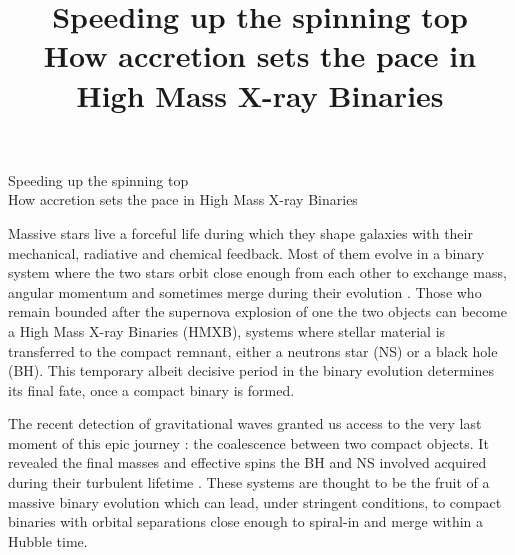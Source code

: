 \documentclass[letterpaper,12pt,onecolumn]{article}
\title{	
\vspace*{-2.5cm}
\Large Speeding up the spinning top\\
\large How accretion sets the pace in High Mass X-ray Binaries  \\ %
}
\author{\tiny} %
\date{\tiny }%
\makeatletter
\newcommand*{\hmxb}{HMXB\@\xspace}
\newcommand*{\ns}{NS\@\xspace}
\newcommand*{\bh}{BH\@\xspace}
\makeatother
\begin{document}


\thispagestyle{empty}

\begin{center}
\Large Speeding up the spinning top\\
\large How accretion sets the pace in High Mass X-ray Binaries 
\end{center}
\normalfont

Massive stars live a forceful life during which they shape galaxies with their mechanical, radiative and chemical feedback. Most of them evolve in a binary system where the two stars orbit close enough from each other to exchange mass, angular momentum and sometimes merge during their evolution \citep{DeMink2012}. Those who remain bounded after the supernova explosion of one the two objects can become a High Mass X-ray Binaries (\hmxb), systems where stellar material is transferred to the compact remnant, either a neutrons star (\ns) or a black hole (\bh). This temporary albeit decisive period in the binary evolution determines its final fate, once a compact binary is formed.

The recent detection of gravitational waves granted us access to the very last moment of this epic journey : the coalescence between two compact objects. It revealed the final masses and effective spins the \bh and \ns involved acquired during their turbulent lifetime \citep{TheLIGOScientificCollaboration2017}. These systems are thought to be the fruit of a massive binary evolution which can lead, under stringent conditions, to compact binaries with orbital separations close enough to spiral-in and merge within a Hubble time.

\end{document}
